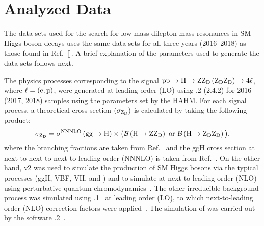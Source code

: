 \section{Analyzed Data}
\label{sec:analyzed_data_dilep}
The data sets used for the search for low-mass dilepton mass resonances in SM Higgs boson decays uses the same data sets for all three years (2016--2018) as those found in Ref.~\ref{}.
A brief explanation of the parameters used to generate the data sets follows next.

The physics processes corresponding to the signal $\mathrm{p} \mathrm{p} \to \mathrm{H} \to \text{Z} \mathrm{Z}_\text{D} \left( \mathrm{Z}_\text{D} \mathrm{Z}_\text{D} \right) \to 4\ell$, where $\ell = (\Pe, \Pmu)$, were generated at leading order (LO) using .2 (2.4.2) for 2016 (2017, 2018) samples using the parameters set by the HAHM.
For each signal process, a theoretical cross section $\left( \sigma_{\mathrm{Z}_\text{D}} \right)$ is calculated by taking the following product:
\begin{equation*}
    \sigma_{\mathrm{Z}_\text{D}} = \sigma^\text{NNNLO}\left( \mathrm{g}\mathrm{g} \to \mathrm{H} \right) \times \big( \mathcal{B} \left( \mathrm{H} \to \text{Z} \mathrm{Z}_\text{D} \right) \text{ or } \mathcal{B} \left( \mathrm{H} \to \mathrm{Z}_\text{D} \mathrm{Z}_\text{D} \right) \big),
\end{equation*}
where the branching fractions are taken from Ref.~\cite{Curtin:2014cca} and the ggH cross section at next-to-next-to-next-to-leading order (NNNLO) is taken from Ref.~\cite{Anastasiou:2016cez}.
On the other hand, \POWHEG v2 was used to simulate the production of SM Higgs bosons via the typical processes (ggH, VBF, VH, and \ttbarh) and to simulate \qqzz at next-to-leading order (NLO) using perturbative quantum chromodynamics~\cite{frixione_matching_2007, bagnaschi_higgs_2012, alioli_general_2010, nason_new_2004}.
The other irreducible background process \ggzz was simulated using .1~\cite{mcfm_campbell_precision_2019} at leading order (LO), to which next-to-leading order (NLO) correction factors were applied~\cite{nlo_corr_grazzini_fully_2018}.
The simulation of \htofourl was carried out by the software .2~\cite{hdecay_gao_spin_2010, hdecay_bolognesi_spin_2012}.

